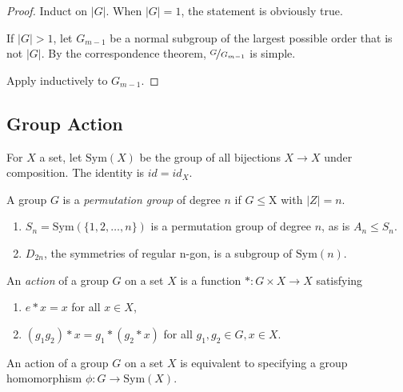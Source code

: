 \begin{proof}
    Induct on \(\left\vert G \right\vert\). When \(\left\vert G \right\vert =1\), the statement is obviously true.

    If \(\left\vert G \right\vert > 1\), let \(G_{m - 1}\) be a normal subgroup of the largest possible order that is not \(\left\vert G \right\vert \). By the correspondence theorem, \(\nicefrac{G}{G_{m - 1}}\) is simple.

    Apply inductively to \(G_{m-1}\).
\end{proof}

\subsection{Group Action}
\leavevmode
\begin{definition}
    For \(X\) a set, let \(\mathrm{Sym}(X)\) be the group of all bijections \(X \to X\) under composition. The identity is \(id = id_X\).

    A group \(G\) is a \textit{permutation group} of degree \(n\) if \(G \leq \mathrm{X}\) with \(\left\vert Z \right\vert = n\).
\end{definition}
\begin{example}
    \leavevmode
    \begin{enumerate}
    \item \(S_n = \mathrm{Sym}(\{1,2, \ldots , n \})\) is a permutation group of degree \(n\), as is \(A_n \leq S_n\).
    \item \(D_{2n}\), the symmetries of regular n-gon, is a subgroup of \(\mathrm{Sym}(n)\).
    \end{enumerate}
\end{example}
\begin{definition}
    An \textit{action} of a group \(G\) on a set \(X\) is a function \(*:G\times X \to  X\) satisfying
    \begin{enumerate}
        \item \(e*x = x\) for all \(x \in X\),
        \item \((g_1g_2)*x = g_1*(g_2*x)\) for all \(g_1, g_2 \in G, x \in X\).
    \end{enumerate}
\end{definition}
\begin{proposition}
    An action of a group \(G\) on a set \(X\) is equivalent to specifying a group homomorphism \(\phi: G \to \mathrm{Sym}(X)\).
\end{proposition}
